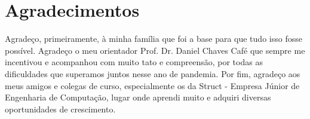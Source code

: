 \chapter*{Agradecimentos}

Agradeço, primeiramente, à minha família que foi a base para que tudo isso fosse possível. Agradeço o meu orientador Prof. Dr. Daniel Chaves Café que sempre me incentivou e acompanhou com muito tato e compreensão, por todas as dificuldades que superamos juntos nesse ano de pandemia. Por fim, agradeço aos meus amigos e colegas de curso, especialmente os da Struct - Empresa Júnior de Engenharia de Computação, lugar onde aprendi muito e adquiri diversas oportunidades de crescimento. 